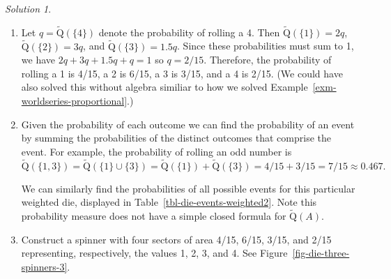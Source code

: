\documentclass[
  letterpaper,
  DIV=11,
  numbers=noendperiod]{scrreprt}
\theoremstyle{plain}
\theoremstyle{definition}
\theoremstyle{definition}
\theoremstyle{definition}
\theoremstyle{remark}
\newtheorem{refsolution}{Solution}[chapter]
\begin{document}
\begin{tcolorbox}[enhanced jigsaw, opacityback=0, rightrule=.15mm, coltitle=black, colframe=quarto-callout-tip-color-frame, toprule=.15mm, colbacktitle=quarto-callout-tip-color!10!white, opacitybacktitle=0.6, left=2mm, toptitle=1mm, breakable, title={Solution (click to expand)}, bottomtitle=1mm, colback=white, leftrule=.75mm, titlerule=0mm, arc=.35mm, bottomrule=.15mm]

\begin{refsolution}
\leavevmode

\begin{enumerate}
\def\labelenumi{\arabic{enumi}.}
\item
  Let \(q = \tilde{\textrm{Q}}(\{4\})\) denote the probability of
  rolling a 4. Then \(\tilde{\textrm{Q}}(\{1\}) = 2q\),
  \(\tilde{\textrm{Q}}(\{2\}) = 3q\), and
  \(\tilde{\textrm{Q}}(\{3\}) = 1.5q\). Since these probabilities must
  sum to 1, we have \(2q + 3q + 1.5q + q = 1\) so \(q = 2/15\).
  Therefore, the probability of rolling a 1 is 4/15, a 2 is 6/15, a 3 is
  3/15, and a 4 is 2/15. (We could have also solved this without algebra
  similiar to how we solved Example~\ref{exm-worldseries-proportional}.)
\item
  Given the probability of each outcome we can find the probability of
  an event by summing the probabilities of the distinct outcomes that
  comprise the event. For example, the probability of rolling an odd
  number is \[
  \tilde{\textrm{Q}}(\{1, 3\}) = \tilde{\textrm{Q}}(\{1\}\cup \{3\}) = \tilde{\textrm{Q}}(\{1\}) + \tilde{\textrm{Q}}(\{3\}) = 4/15+ 3/15 = 7/15 \approx 0.467.
  \]

  We can similarly find the probabilities of all possible events for
  this particular weighted die, displayed in
  Table~\ref{tbl-die-events-weighted2}. Note this probability measure
  does not have a simple closed formula for \(\tilde{\textrm{Q}}(A)\).
\item
  Construct a spinner with four sectors of area 4/15, 6/15, 3/15, and
  2/15 representing, respectively, the values 1, 2, 3, and 4. See
  Figure~\ref{fig-die-three-spinners-3}.
\end{enumerate}

\label{sol-dice-normalize}

\end{refsolution}

\end{tcolorbox}
\end{document}
